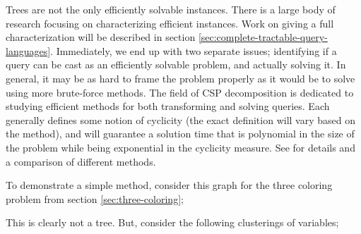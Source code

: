 Trees are not the only efficiently solvable instances. There is a large body of research focusing on characterizing efficient instances. Work on giving a full characterization will be described in section \ref{sec:complete-tractable-query-languages}. Immediately, we end up with two separate issues; identifying if a query can be cast as an efficiently solvable problem, and actually solving it. In general, it may be as hard to frame the problem properly as it would be to solve using more brute-force methods. The field of CSP decomposition is dedicated to studying efficient methods for both transforming and solving queries. Each generally defines some notion of cyclicity (the exact definition will vary based on the method), and will guarantee a solution time that is polynomial in the size of the problem while being exponential in the cyclicity measure. See \citep{gottlob2000comparison} for details and a comparison of different methods.

To demonstrate a simple method, consider this graph for the three coloring problem from section \ref{sec:three-coloring};

\begin{center}
\end{center}

This is clearly not a tree. But, consider the following clusterings of variables;

\begin{center}
\end{center}

